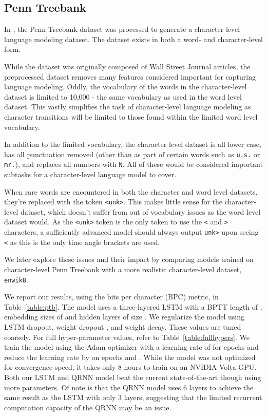 \documentclass{article}
\newcommand{\enwik}{\texttt{enwik8}\xspace}
\begin{document}
\subsection{Penn Treebank}

In \citet{Mikolov2010}, the Penn Treebank dataset \citep{marcus1994penn} was processed to generate a character-level language modeling dataset.
The dataset exists in both a word- and character-level form.

While the dataset was originally composed of Wall Street Journal articles, the preprocessed dataset removes many features considered important for capturing language modeling.
Oddly, the vocabulary of the words in the character-level dataset is limited to 10,000 - the same vocabulary as used in the word level dataset.
This vastly simplifies the task of character-level language modeling as character transitions will be limited to those found within the limited word level vocabulary.

In addition to the limited vocabulary, the character-level dataset is all lower case, has all punctuation removed (other than as part of certain words such as \verb+u.s.+ or \verb+mr.+), and replaces all numbers with \verb+N+.
All of these would be considered important subtasks for a character-level language model to cover.

When rare words are encountered in both the character and word level datasets, they're replaced with the token \verb+<unk>+.
This makes little sense for the character-level dataset, which doesn't suffer from out of vocabulary issues as the word level dataset would.
As the \verb+<unk>+ token is the only token to use the \verb+<+ and \verb+>+ characters, a sufficiently advanced model should always output \verb+unk>+ upon seeing \verb+<+ as this is the only time angle brackets are used.

We later explore these issues and their impact by comparing models trained on character-level Penn Treebank with a more realistic character-level dataset, \enwik.

We report our results, using the bits per character (BPC) metric, in Table~\ref{table:ptb}.
The model uses a three-layered LSTM with a BPTT length of , embedding sizes of  and hidden layers of size .
We regularize the model using LSTM dropout, weight dropout \cite{merity2018regularizing}, and weight decay.
These values are tuned coarsely.
For full hyper-parameter values, refer to Table~\ref{table:fullhypers}.
We train the model using the Adam \cite{kingma2014adam} optimizer with a learning rate of  for  epochs and reduce the learning rate by  on epochs  and .
While the model was not optimized for convergence speed, it takes only 8 hours to train on an NVIDIA Volta GPU.
Both our LSTM and QRNN model beat the current state-of-the-art though using more parameters.
Of note is that the QRNN model uses 6 layers to achieve the same result as the LSTM with only 3 layers, suggesting that the limited recurrent computation capacity of the QRNN may be an issue.
\end{document}
